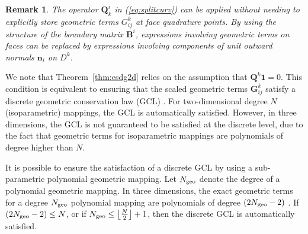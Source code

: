 \documentclass[review,onefignum,onetabnum,final]{siamart171218}
\newtheorem*{remark}{Remark}
\begin{document}
\begin{remark}
The operator $\bm{Q}^i_k$  in (\ref{eq:splitcurv}) can be applied without needing to explicitly store geometric terms $G^k_{ij}$ at face quadrature points.  By using the structure of the boundary matrix $\bm{B}^i$, expressions involving geometric terms on faces can be replaced by expressions involving components of unit outward normals $\bm{n}_i$ on $D^k$.  
\end{remark}

We note that Theorem~\ref{thm:esdg2d} relies on the assumption that $\bm{Q}^k\bm{1} = 0$.  This condition is equivalent to ensuring that the scaled geometric terms ${\bm{G}}^k_{ij}$ satisfy a discrete geometric conservation law (GCL) \cite{carpenter2014entropy, gassner2017br1, crean2018entropy, chan2018discretely}.  For two-dimensional degree $N$ (isoparametric) mappings, the GCL is automatically satisfied.  However, in three dimensions, the GCL is not guaranteed to be satisfied at the discrete level, due to the fact that geometric terms for isoparametric mappings are polynomials of degree higher than $N$.  

It is possible to ensure the satisfaction of a discrete GCL by using a sub-parametric polynomial geometric mapping.  Let $N_{\rm geo}$ denote the degree of a polynomial geometric mapping.  In three dimensions, the exact geometric terms for a degree $N_{\rm geo}$ polynomial mapping are polynomials of degree $(2N_{\rm geo} - 2)$ \cite{kopriva2006metric, hindenlang2012explicit, crean2018entropy}.  If $(2N_{\rm geo}-2) \leq N$, or if $N_{\rm geo} \leq \left\lfloor\frac{N}{2}\right\rfloor + 1$, then the discrete GCL is automatically satisfied.  
\end{document}
